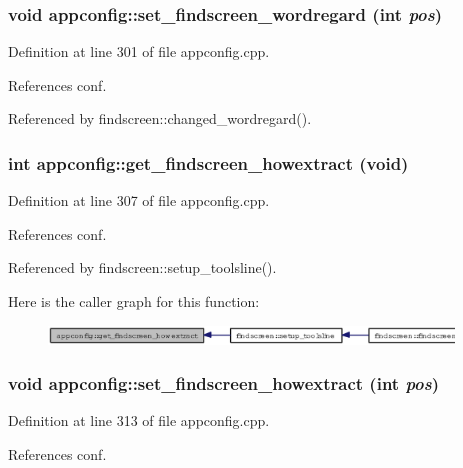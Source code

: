 \subsubsection{\setlength{\rightskip}{0pt plus 5cm}void appconfig::set\_\-findscreen\_\-wordregard (int {\em pos})}\label{classappconfig_09a324fbbbe567484dc5679f652c690d}




Definition at line 301 of file appconfig.cpp.

References conf.

Referenced by findscreen::changed\_\-wordregard().
\subsubsection{\setlength{\rightskip}{0pt plus 5cm}int appconfig::get\_\-findscreen\_\-howextract (void)}\label{classappconfig_6b4dbe6b7dae577ac8264353675c8227}




Definition at line 307 of file appconfig.cpp.

References conf.

Referenced by findscreen::setup\_\-toolsline().

Here is the caller graph for this function:\begin{figure}[H]
\begin{center}
\leavevmode
\includegraphics[width=305pt]{classappconfig_6b4dbe6b7dae577ac8264353675c8227_icgraph}
\end{center}
\end{figure}
\subsubsection{\setlength{\rightskip}{0pt plus 5cm}void appconfig::set\_\-findscreen\_\-howextract (int {\em pos})}\label{classappconfig_5e7575dcf4b71cf2860782b907a0eadc}




Definition at line 313 of file appconfig.cpp.

References conf.


